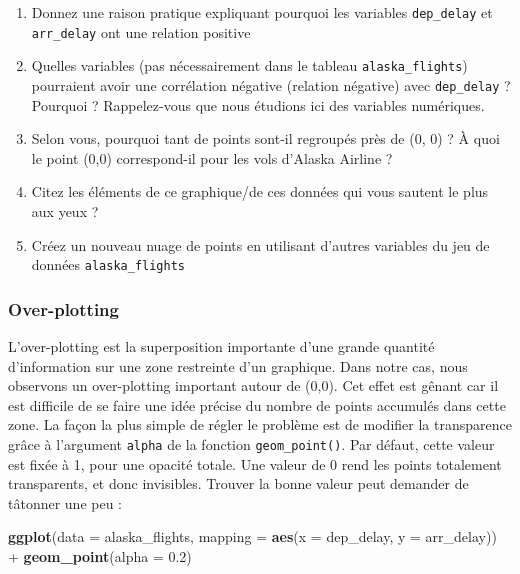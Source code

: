 \documentclass[a4paperpaper,]{article}
\newenvironment{Shaded}{\begin{snugshade}}{\end{snugshade}}
\newcommand{\DataTypeTok}[1]{\textcolor[rgb]{0.00,0.34,0.68}{#1}}
\newcommand{\FloatTok}[1]{\textcolor[rgb]{0.69,0.50,0.00}{#1}}
\newcommand{\KeywordTok}[1]{\textcolor[rgb]{0.12,0.11,0.11}{\textbf{#1}}}
\newcommand{\NormalTok}[1]{\textcolor[rgb]{0.12,0.11,0.11}{#1}}
\newcommand{\OperatorTok}[1]{\textcolor[rgb]{0.12,0.11,0.11}{#1}}
\newcommand{\StringTok}[1]{\textcolor[rgb]{0.75,0.01,0.01}{#1}}
\providecommand{\tightlist}{%
  \setlength{\itemsep}{0pt}\setlength{\parskip}{0pt}}
\theoremstyle{definition}
\theoremstyle{definition}
\theoremstyle{definition}
\theoremstyle{remark}
\begin{document}
\begin{enumerate}
\def\labelenumi{\arabic{enumi}.}
\tightlist
\item
  Donnez une raison pratique expliquant pourquoi les variables
  \texttt{dep\_delay} et \texttt{arr\_delay} ont une relation positive
\item
  Quelles variables (pas nécessairement dans le tableau
  \texttt{alaska\_flights}) pourraient avoir une corrélation négative
  (relation négative) avec \texttt{dep\_delay} ? Pourquoi ?
  Rappelez-vous que nous étudions ici des variables numériques.
\item
  Selon vous, pourquoi tant de points sont-il regroupés près de (0, 0) ?
  À quoi le point (0,0) correspond-il pour les vols d'Alaska Airline ?
\item
  Citez les éléments de ce graphique/de ces données qui vous sautent le
  plus aux yeux ?
\item
  Créez un nouveau nuage de points en utilisant d'autres variables du
  jeu de données \texttt{alaska\_flights}
\end{enumerate}

\hypertarget{over-plotting}{%
\subsubsection{Over-plotting}\label{over-plotting}}

L'over-plotting est la superposition importante d'une grande quantité
d'information sur une zone restreinte d'un graphique. Dans notre cas,
nous observons un over-plotting important autour de (0,0). Cet effet est
gênant car il est difficile de se faire une idée précise du nombre de
points accumulés dans cette zone. La façon la plus simple de régler le
problème est de modifier la transparence grâce à l'argument
\texttt{alpha} de la fonction \texttt{geom\_point()}. Par défaut, cette
valeur est fixée à 1, pour une opacité totale. Une valeur de 0 rend les
points totalement transparents, et donc invisibles. Trouver la bonne
valeur peut demander de tâtonner une peu :

\begin{Shaded}
\begin{Highlighting}[]
\KeywordTok{ggplot}\NormalTok{(}\DataTypeTok{data =}\NormalTok{ alaska_flights, }\DataTypeTok{mapping =} \KeywordTok{aes}\NormalTok{(}\DataTypeTok{x =}\NormalTok{ dep_delay, }\DataTypeTok{y =}\NormalTok{ arr_delay)) }\OperatorTok{+}\StringTok{ }
\StringTok{  }\KeywordTok{geom_point}\NormalTok{(}\DataTypeTok{alpha =} \FloatTok{0.2}\NormalTok{)}
\end{Highlighting}
\end{Shaded}
\end{document}
